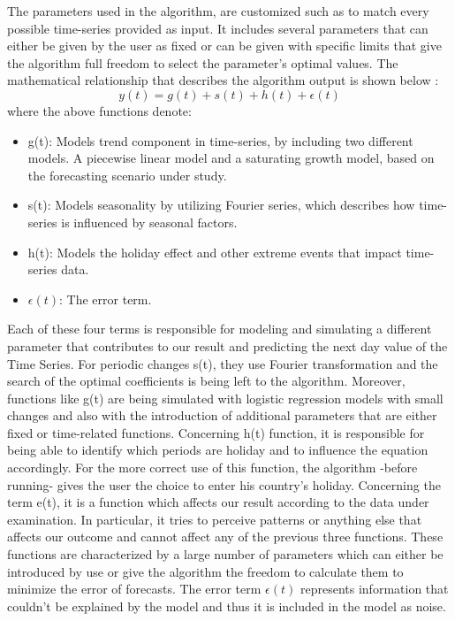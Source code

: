 The parameters used in the algorithm, are customized such as to match every possible time-series provided as input. It includes several parameters that can either be given by the user as fixed or can be given with specific limits that give the algorithm full freedom to select the parameter's optimal values. The mathematical relationship that describes the algorithm output is shown below \cite{taylor2018forecasting}:
$$y(t)=g(t)+s(t)+h(t)+\epsilon(t)$$
\noindent where the above functions denote:
\begin{itemize}
    \item g(t): Models trend component in time-series, by including two different models. A piecewise linear model and a saturating growth model, based on the forecasting scenario under study.
    \item s(t): Models seasonality by utilizing Fourier series, which describes how time-series is influenced by seasonal factors.
    \item h(t): Models the holiday effect and other extreme events that impact time-series data.
        \item $\epsilon(t)$: The error term.
\end{itemize}
\par Each of these four terms is responsible for modeling and simulating a different parameter that contributes to our result and predicting the next day value of the Time Series. For periodic changes s(t), they use Fourier transformation and the search of the optimal coefficients is being left to the algorithm. Moreover, functions like g(t) are being simulated with logistic regression models with small changes and also with the introduction of additional parameters that are either fixed or time-related functions. Concerning h(t) function, it is responsible for being able to identify which periods are holiday and to influence the equation accordingly. For the more correct use of this function, the algorithm -before running- gives the user the choice to enter his country's holiday. 
Concerning the term e(t), it is a function which affects our result according to the data under examination. In particular, it tries to perceive patterns or anything else that affects our outcome and cannot affect any of the previous three functions. These functions are characterized by a large number of parameters which can either be introduced by use or give the algorithm the freedom to calculate them to minimize the error of forecasts. The error term  $\epsilon(t)$  represents information that couldn't be explained by the model and thus it is included in the model as noise.
